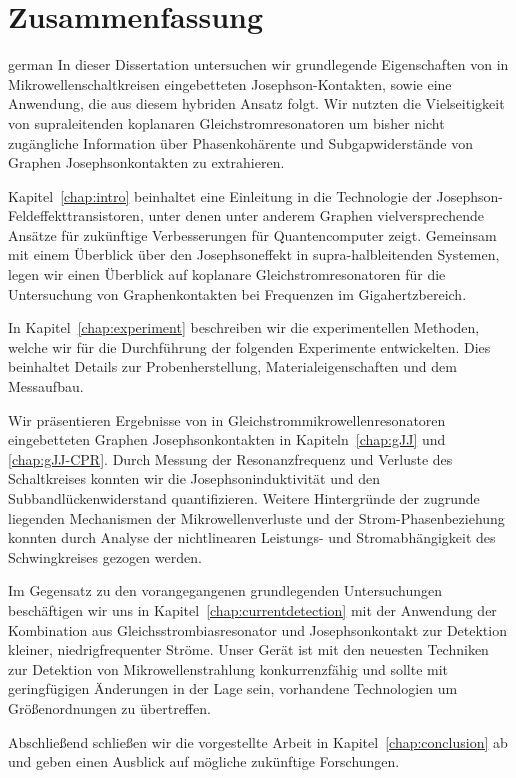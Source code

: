 
\chapter*{Zusammenfassung}

\begin{otherlanguage*}{german}
In dieser Dissertation untersuchen wir grundlegende Eigenschaften von in Mikrowellenschaltkreisen eingebetteten Josephson-Kontakten, sowie eine Anwendung, die aus diesem hybriden Ansatz folgt.
%
Wir nutzten die Vielseitigkeit von supraleitenden koplanaren Gleichstromresonatoren um bisher nicht zugängliche Information über Phasenkohärente und Subgapwiderstände von Graphen Josephsonkontakten zu extrahieren.

\noindent \newline
Kapitel~\ref{chap:intro} beinhaltet eine Einleitung in die Technologie der Josephson-Feldeffekttransistoren, unter denen unter anderem Graphen vielversprechende Ansätze für zukünftige Verbesserungen für Quantencomputer zeigt.
%
Gemeinsam mit einem Überblick über den Josephsoneffekt in supra-halbleitenden Systemen, legen wir einen Überblick auf koplanare Gleichstromresonatoren für die Untersuchung von Graphenkontakten bei Frequenzen im Gigahertzbereich.

\noindent \newline
In Kapitel~\ref{chap:experiment} beschreiben wir die experimentellen Methoden, welche wir für die Durchführung der folgenden Experimente entwickelten.
%
Dies beinhaltet Details zur Probenherstellung, Materialeigenschaften und dem Messaufbau.

\noindent \newline
Wir präsentieren Ergebnisse von in Gleichstrommikrowellenresonatoren eingebetteten Graphen Josephsonkontakten in Kapiteln~\ref{chap:gJJ} und \ref{chap:gJJ-CPR}.
%
Durch Messung der Resonanzfrequenz und Verluste des Schaltkreises konnten wir die Josephsoninduktivität und den Subbandlückenwiderstand quantifizieren.
%
Weitere Hintergründe der zugrunde liegenden Mechanismen der Mikrowellenverluste und der Strom-Phasenbeziehung konnten durch Analyse der nichtlinearen Leistungs- und Stromabhängigkeit des Schwingkreises gezogen werden.

\noindent \newline
Im Gegensatz zu den vorangegangenen grundlegenden Untersuchungen beschäftigen wir uns in Kapitel~\ref{chap:currentdetection} mit der Anwendung der Kombination aus Gleichsstrombiasresonator und Josephsonkontakt zur Detektion kleiner, niedrigfrequenter Ströme.
%
Unser Gerät ist mit den neuesten Techniken zur Detektion von Mikrowellenstrahlung konkurrenzfähig und sollte mit geringfügigen Änderungen in der Lage sein, vorhandene Technologien um Größenordnungen zu übertreffen.

\noindent \newline
Abschließend schließen wir die vorgestellte Arbeit in Kapitel~\ref{chap:conclusion} ab und geben einen Ausblick auf mögliche zukünftige Forschungen.

\end{otherlanguage*}

